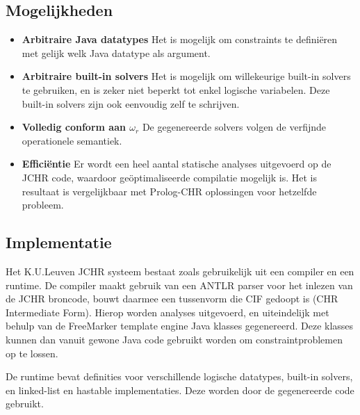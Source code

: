 \subsection{Mogelijkheden}

\begin{itemize}
\item {\bf Arbitraire Java datatypes} Het is mogelijk om constraints te defini\"eren met gelijk welk Java datatype als argument.
\item {\bf Arbitraire built-in solvers} Het is mogelijk om willekeurige built-in solvers te gebruiken, en is zeker niet beperkt tot enkel logische variabelen. Deze built-in solvers zijn ook eenvoudig zelf te schrijven.
\item {\bf Volledig conform aan $\omega_r$} De gegenereerde solvers volgen de verfijnde operationele semantiek.
\item {\bf Effici\"entie} Er wordt een heel aantal statische analyses uitgevoerd op de JCHR code, waardoor ge\"optimaliseerde compilatie mogelijk is. Het is resultaat is vergelijkbaar met Prolog-CHR oplossingen voor hetzelfde probleem.
\end{itemize}

\subsection{Implementatie}

Het K.U.Leuven JCHR systeem bestaat zoals gebruikelijk uit een compiler en een runtime. De compiler maakt gebruik van een ANTLR parser voor het inlezen van de JCHR broncode, bouwt daarmee een tussenvorm die CIF gedoopt is (CHR Intermediate Form). Hierop worden analyses uitgevoerd, en uiteindelijk met behulp van de FreeMarker template engine Java klasses gegenereerd. Deze klasses kunnen dan vanuit gewone Java code gebruikt worden om constraintproblemen op te lossen.

De runtime bevat definities voor verschillende logische datatypes, built-in solvers, en linked-list en hastable implementaties. Deze worden door de gegenereerde code gebruikt.
